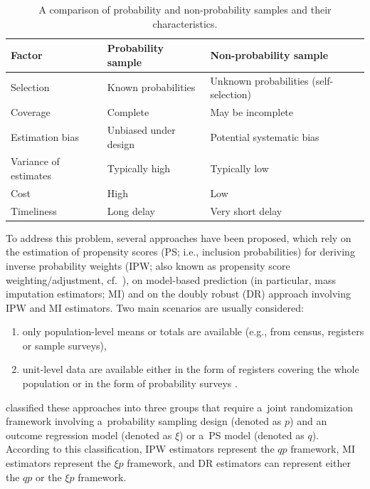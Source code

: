 \documentclass[nojss]{jss}
\begin{document}
\begin{table}[ht!]
    \centering
    \begin{tabular}{lll}
    \hline
    \textbf{Factor}   &  \textbf{Probability sample} & \textbf{Non-probability sample}\\
    \hline
    Selection & Known probabilities & Unknown probabilities (self-selection) \\
    Coverage & Complete & May be incomplete \\
    Estimation bias & Unbiased under design & Potential systematic bias \\
    Variance of estimates & Typically high & Typically low \\
    Cost & High & Low \\
    Timeliness & Long delay & Very short delay \\
    \hline
    \end{tabular}
    \caption{A comparison of probability and non-probability samples and their characteristics.}
    \label{tab-comparison-characteristics}
\end{table}

To address this problem, several approaches have been proposed, which
rely on the estimation of propensity scores (PS; i.e., inclusion
probabilities) for deriving inverse probability weights (IPW; also known
as propensity score weighting/adjustment,
cf.~\citet{lee2006propensity, lee2009estimation}), on model-based
prediction (in particular, mass imputation estimators; MI) and on the
doubly robust (DR) approach involving IPW and MI estimators. Two main
scenarios are usually considered:

\begin{enumerate}
\item only population-level means or totals are available (e.g., from census, registers or sample surveys), 
\item unit-level data are available either in the form of registers covering the whole population or in the form of probability surveys \citep[cf.][]{elliott_inference_2017}. 
\end{enumerate}

\citet{wu2022statistical} classified these approaches into three groups
that require a~joint randomization framework involving a~probability
sampling design (denoted as \(p\)) and an outcome regression model
(denoted as \(\xi\)) or a~PS model (denoted as \(q\)). According to this
classification, IPW estimators represent the \(qp\) framework, MI
estimators represent the \(\xi p\) framework, and DR estimators can
represent either the \(qp\) or the \(\xi p\) framework.
\end{document}
